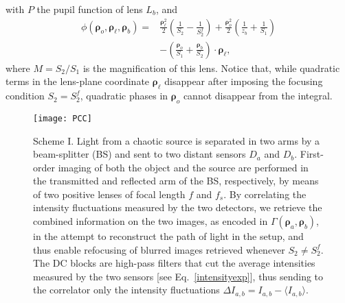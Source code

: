 \documentclass[aps,pra,amssymb,twocolumn,amsmath,superscriptaddress,showpacs,10pt]{revtex4-1}
\begin{document}
with $P$ the pupil function of lens $L_b$, and
\begin{align}\label{phasefirst}
\phi(\bm{\rho}_o,\bm{\rho}_{\ell},\bm{\rho}_b) = & \frac{\bm{\rho}_{\ell}^2}{2}\left(\frac{1}{S_2}-\frac{1}{S_2^f}\right) + \frac{\bm{\rho}_{o}^2}{2}\left(\frac{1}{z_b}+\frac{1}{S_1}\right) \nonumber \\ & - \left(\frac{\bm{\rho}_o}{S_1} + \frac{\bm{\rho}_b}{S_2}\right)\cdot \bm{\rho}_{\ell} ,
\end{align}
where $M=S_2/S_1$ is the magnification of this lens. Notice that, while quadratic terms in the lens-plane coordinate $\bm{\rho}_{\ell}$ disappear after imposing the focusing condition $S_2=S_2^f$, quadratic phases in $\bm{\rho}_o$ cannot disappear from the integral.

\begin{figure}
\centering
\texttt{[image: PCC]}
\caption{Scheme I. Light from a chaotic source is separated in two arms by a beam-splitter (BS) and sent to two distant sensors $D_a$ and $D_b$. First-order imaging of both the object and the source are performed in the transmitted and reflected arm of the BS, respectively, by means of two positive lenses of focal length $f$ and $f_s$. By correlating the intensity fluctuations measured by the two detectors, we retrieve the combined information on the two images, as encoded in $\Gamma(\bm{\rho}_a,\bm{\rho}_b)$, in the attempt to reconstruct the path of light in the setup, and thus enable refocusing of blurred images retrieved whenever $S_2\neq S_2^f$. The DC blocks are high-pass filters that cut the average intensities measured by the two sensors [see Eq.\ \eqref{intensityexp}], thus sending to the correlator only the intensity fluctuations $\Delta I_{a,b}=I_{a,b}-\langle I_{a,b} \rangle$. }\label{fig.PCC}
\end{figure}
\end{document}
